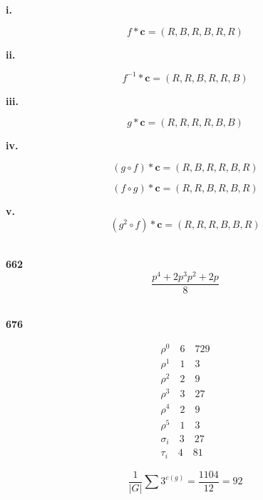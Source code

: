 \documentclass[UTF8]{ctexart}
\begin{document}
    \textbf{i.}

    \begin{equation*}
        f\ast \mathbf{c}=(R,B,R,B,R,R)
    \end{equation*}

    \textbf{ii.}

    \begin{equation*}
        f^{-1}\ast \mathbf{c}=(R,R,B,R,R,B)
    \end{equation*}
    
    \textbf{iii.}

    \begin{equation*}
        g\ast \mathbf{c}=(R,R,R,R,B,B)
    \end{equation*}

    \textbf{iv.}

    \begin{equation*}
        (g\circ f)\ast \mathbf{c}=(R,B,R,R,B,R)
    \end{equation*}

    \begin{equation*}
        (f\circ g)\ast \mathbf{c}=(R,R,B,R,B,R)
    \end{equation*}

    \textbf{v.}
    \begin{equation*}
        (g^2\circ f)\ast \mathbf{c}=(R,R,R,B,B,R)
    \end{equation*}

    ~\\
    \noindent\textbf{662}
    \begin{equation*}
        \frac{p^4+2p^3p^2+2p}{8}
    \end{equation*}

    ~\\
    \noindent\textbf{676}

    \begin{equation*}
        \begin{matrix}
            \rho^0 \quad 6\quad  729\\ \rho^1\quad 1 \quad 3 \\ \rho^2\quad 2 \quad 9\\ \rho^3 \quad 3\quad  27 
\\ \rho^4 \quad2 \quad 9\\ \rho^5\quad 1 \quad 3 \\ \sigma_i \quad 3 \quad 27\\ \tau_i\quad 4\quad 81
        \end{matrix}
    \end{equation*}

    \begin{equation*}
        \frac{1}{|G|}\sum 3^{c(g)}=\frac{1104}{12}=92
    \end{equation*}
\end{document}
